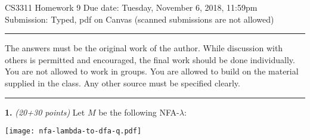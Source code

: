 \documentclass[12pt]{article}
\begin{document}
\thispagestyle{empty}

{\large CS3311 Homework 9} \hfill
Due date: Tuesday, November 6, 2018, 11:59pm\\
\hfill
Submission: Typed, pdf on Canvas (scanned submissions are not allowed)\\
\vspace{-0.1in}
\rule{\textwidth}{0.5mm}

\begin{small}
The answers must be the original work of the author.  While discussion
with others is permitted and encouraged, the final work should be done
individually. You are not allowed to work in groups.  You are allowed to
build on the material supplied in the class. Any other source must be
specified clearly.
\end{small}
\rule{\textwidth}{0.5mm}


{\bf 1.} {\em (20+30 points)} Let $M$ be the following NFA-$\lambda$:

\vspace{-0.15in}

\begin{center}
\texttt{[image: nfa-lambda-to-dfa-q.pdf]}
\end{center}

\vspace{-0.1in}
\end{document}
